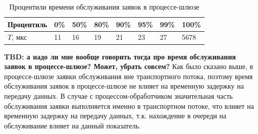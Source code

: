 \begin{table}[!h]
\caption{Процентили времени обслуживания заявок в процессе-шлюзе}\label{chapter41:TableTR}
\centering
\begin{tabular}{|l|l|l|l|l|l|l|l|}
\hline
Процентиль & 0\% & 50\% & 80\% & 90\% & 95\% & 99\% & 100\% \\ \hline
$T$, мкс & 11 & 16 & 19 & 21 & 23 & 27 & 5678 \\ \hline
\end{tabular}
\end{table}

\textbf{TBD: а надо ли мне вообще говорить тогда про время обслуживания заявок в процессе-шлюзе? Может, убрать совсем?}
Как было сказано выше, в процессе-шлюзе заявки обслуживания вне транспортного потока, поэтому время обслуживания заявок в процессе-шлюзе не влияет на временную задержку на передачу данных. В случае с процессом-обработчиком значительная часть обслуживания заявки выполняется именно в транспортном потоке, что влияет на временную задержку на передачу данных, т.к. нахождение в очереди на обслуживание влияет на данный показатель.
